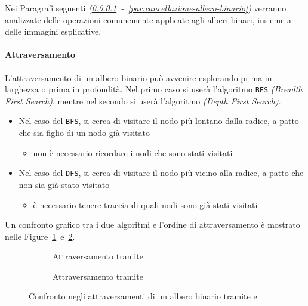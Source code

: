 \documentclass[italian, 10pt]{article}
\begin{document}
Nei Paragrafi seguenti \textit{(\ref{attraversamento-albero-binario}~-~\ref{par:cancellazione-albero-binario})} verranno analizzate delle operazioni comunemente applicate agli alberi binari, insieme a delle immagini esplicative.

\paragraph{Attraversamento}
\label{attraversamento-albero-binario}

L'attraversamento di un albero binario può avvenire esplorando prima in larghezza o prima in profondità.
Nel primo caso si userà l'algoritmo \texttt{BFS} \textit{(Breadth First Search)}, mentre nel secondo si userà l'algoritmo \DFS \textit{(Depth First Search)}.

\begin{itemize}
  \item Nel caso del \texttt{BFS}, si cerca di visitare il nodo più lontano dalla radice, a patto che sia figlio di un nodo già visitato
        \begin{itemize}
          \item non è necessario ricordare i nodi che sono stati visitati
        \end{itemize}
  \item Nel caso del \texttt{DFS}, si cerca di visitare il nodo più vicino alla radice, a patto che non sia già stato visitato
        \begin{itemize}
          \item è necessario tenere traccia di quali nodi sono già stati visitati
        \end{itemize}
\end{itemize}

\bigskip
Un confronto grafico tra i due algoritmi e l'ordine di attraversamento è mostrato nelle Figure~\ref{fig:attraversamento-albero-bfs}~e~\ref{fig:attraversamento-albero-dfs}.

\begin{figure}
  \bigskip
  \centering
  \begin{subfigure}[t]{0.45\textwidth}
    \centering
    \caption{Attraversamento tramite \BFS}
    \label{fig:attraversamento-albero-bfs}
  \end{subfigure}
  \begin{subfigure}[t]{0.45\textwidth}
    \centering
    \caption{Attraversamento tramite \DFS}
    \label{fig:attraversamento-albero-dfs}
  \end{subfigure}
  \caption{Confronto negli attraversamenti di un albero binario tramite \BFS e \DFS}
  \label{fig:confronto-attraversamento-bfs-dfs}
  \bigskip
\end{figure}
\end{document}
